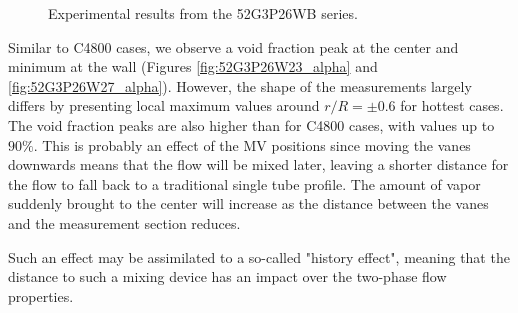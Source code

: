 \begin{figure}[!h]
\centering
{}

\caption{Experimental results from the 52G3P26WB series.}
\label{fig:exp_52G3P26W27}
\end{figure}

\npar

Similar to C4800 cases, we observe a void fraction peak at the center and minimum at the wall (Figures \ref{fig:52G3P26W23_alpha} and \ref{fig:52G3P26W27_alpha}). However, the shape of the measurements largely differs by presenting local maximum values around $r/R = \pm 0.6$ for hottest cases. The void fraction peaks are also higher than for C4800 cases, with values up to $90\%$. This is probably an effect of the MV positions since moving the vanes downwards means that the flow will be mixed later, leaving a shorter distance for the flow to fall back to a traditional single tube profile. The amount of vapor suddenly brought to the center will increase as the distance between the vanes and the measurement section reduces.

\begin{remark*}{}
Such an effect may be assimilated to a so-called "history effect", meaning that the distance to such a mixing device has an impact over the two-phase flow properties.
\end{remark*}

